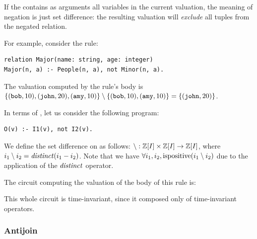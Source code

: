 If the  contains as arguments all variables in the current valuation,
the meaning of negation is just set difference: the resulting valuation
will \emph{exclude} all tuples from the negated relation.

For example, consider the rule:

\begin{lstlisting}[language=ddlog]
relation Major(name: string, age: integer)
Major(n, a) :- People(n, a), not Minor(n, a).
\end{lstlisting}

The valuation computed by the rule's body is $\{ (\mbox{\texttt{bob}}, 10), (\mbox{\texttt{john}}, 20), (\mbox{\texttt{amy}}, 10) \}
\setminus \{ (\mbox{\texttt{bob}}, 10), (\mbox{\texttt{amy}}, 10) \} = \{ (\mbox{\texttt{john}}, 20) \}$.

In terms of \zrs, let us consider the following program:

\begin{lstlisting}[language=ddlog]
O(v) :- I1(v), not I2(v).
\end{lstlisting}

We define the set difference on \zrs as follows:
$\setminus: \mathbb{Z}[I] \times \mathbb{Z}[I] \rightarrow \mathbb{Z}[I]$, where $i_1
\setminus i_2 = \mathit{distinct}(i_1 - i_2)$.  Note
that we have $\forall i_1, i_2, \mbox{ispositive}(i_1 \setminus
i_2)$ due to the application of the $\mathit{distinct}$ operator.

The circuit computing the valuation of the body of this rule is:


This whole circuit is time-invariant, since it composed only of
time-invariant operators.

\subsubsection{Antijoin}\label{sec:antijoin}

